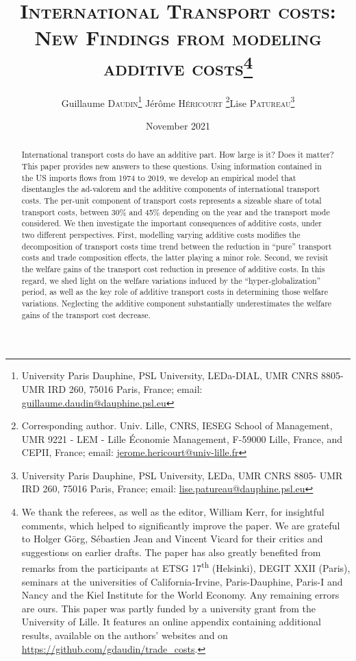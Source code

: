 \documentclass[a4paper,11pt]{article}
\begin{document}
\title{\textsc{International Transport costs:\\New Findings from modeling additive costs}\thanks{We thank the referees, as well as the editor, William Kerr, for insightful comments, which helped to significantly improve the paper. We are grateful to Holger G\"{o}rg, S\'{e}bastien Jean and Vincent Vicard for their critics and suggestions on earlier drafts. The paper has also greatly benefited from remarks from the participants at ETSG 17\textsuperscript{th} (Helsinki), DEGIT XXII (Paris), seminars at the universities of California-Irvine, Paris-Dauphine, Paris-I and Nancy and the Kiel Institute for the World Economy. Any remaining errors are ours. This paper was partly funded by a university grant from the University of Lille. It features an online appendix containing additional results, available on the authors' websites and on \url{https://github.com/gdaudin/trade_costs}.}}

\author{Guillaume \textsc{Daudin}\thanks{%
University Paris Dauphine, PSL University, LEDa-DIAL, UMR CNRS 8805- UMR IRD 260, 75016 Paris, France; email: \url{guillaume.daudin@dauphine.psl.eu}}  \qquad J\'{e}r\^{o}me \textsc{H\'{e}ricourt} \thanks{Corresponding author. Univ. Lille, CNRS, IESEG School of Management, UMR 9221 - LEM - Lille Économie Management, F-59000 Lille, France, and CEPII, France; email: \url{jerome.hericourt@univ-lille.fr}}\qquad Lise \textsc{Patureau}\thanks{
University Paris Dauphine, PSL University, LEDa, UMR CNRS 8805- UMR IRD 260, 75016 Paris, France;  email: \url{lise.patureau@dauphine.psl.eu} } }


\date{November 2021}
 \maketitle
\bigskip

\begin{abstract}
International transport costs do have an additive part. How large is it? Does it matter? This paper provides new answers to these questions. Using information contained in the US imports flows from 1974 to 2019, we develop an empirical model that disentangles the ad-valorem and the additive components of international transport costs. The per-unit component of transport costs represents a sizeable share of total transport costs, between 30\% and 45\% depending on the year and the transport mode considered. We then investigate the important consequences of additive costs, under two different perspectives. First, modelling varying additive costs modifies the decomposition of transport costs time trend between the reduction in ``pure'' transport costs and trade composition effects, the latter playing a minor role. Second, we revisit the welfare gains of the transport cost reduction in presence of additive costs. In this regard, we shed light on the welfare variations induced by the ``hyper-globalization'' period, as well as the key role of additive transport costs in determining those welfare variations. Neglecting the additive component substantially underestimates the welfare gains of the transport cost decrease.
\end{abstract}
\end{document}
